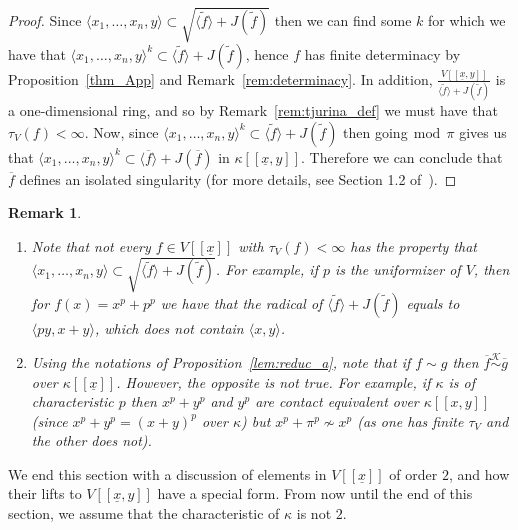 \documentclass{article}
\newtheorem{remark}[theorem]{Remark}
\newcommand{\equivk}{\overset{\mathcal{K}}{\sim}}
\newcommand{\Vx}{V[[\underline{x}]]}
\newcommand{\Vxy}{V[[\underline{x},y]]}
\numberwithin{theorem}{section}
\renewcommand{\mod}{\,\operatorname{mod}\,}
\begin{document}
\begin{proof}
    Since  $\langle x_1, \dots, x_n,y \rangle \subset  \sqrt{\langle \tilde{f} \rangle + J(\tilde{f})}$ then we can find some $k$ for which we have that $\langle x_1, \dots, x_n,y \rangle^k \subset \langle \tilde{f} \rangle +  J(\tilde{f})$, hence $f$ has finite determinacy by Proposition~\ref{thm_App} and Remark~\ref{rem:determinacy}. In addition, $\frac{\Vxy}{\langle \tilde{f} \rangle + J(\tilde{f})}$ is a one-dimensional ring, and so by Remark~\ref{rem:tjurina_def} we must have that $\tau_V\left(f\right) < \infty$. Now, since $\langle x_1, \dots, x_n,y \rangle^k \subset \langle \tilde{f} \rangle +  J(\tilde{f})$ then going$\mod    \pi$ gives us that $\langle x_1, \dots, x_n, y \rangle^k \subset \langle \overline{f} \rangle +  J\left(\overline{f}\right)$ in $\kappa[[\underline{x},y]]$. Therefore we can conclude that $\overline{f}$ defines an isolated singularity (for more details, see Section 1.2 of~\cite{boubakri2009hypersurface}).
\end{proof}

\begin{remark}
\begin{enumerate}
    \item \textup{Note that not every $f \in \Vx$ with $\tau_V\left(f\right) < \infty$ has the property that $\langle x_1, \dots, x_n,y \rangle \subset  \sqrt{\langle \tilde{f} \rangle + J(\tilde{f})}$. For example, if $p$ is the uniformizer of $V$, then for $f\left(x\right)=x^p+p^p$ we have that the radical of  ${\langle \tilde{f} \rangle + J(\tilde{f})}$ equals to $\langle py,  x+y \rangle$, which does not contain $\langle x,y \rangle$. }
    \item \textup{Using the notations of Proposition~\ref{lem:reduc_a}, note that if $f \sim g$ then $\overline{f} \equivk \overline{g}$ over $\kappa[[\underline{x}]]$. However, the opposite is not true. For example, if $\kappa$ is of characteristic $p$ then $x^p+y^p$ and $y^p$ are contact equivalent over $\kappa[[x,y]]$ (since $x^p+y^p=(x+y)^p$ over $\kappa$) but $x^p+\pi^p \not\sim x^p$ (as one has finite $\tau_V$ and the other does not).}
\end{enumerate}
\end{remark}

We end this section with a discussion of elements in $V[[\underline{x}]]$ of order $2$, and how their lifts to $V[[\underline{x},y]]$ have a special form. From now until the end of this section, we assume that the characteristic of $\kappa$ is not $2$. 
\end{document}
